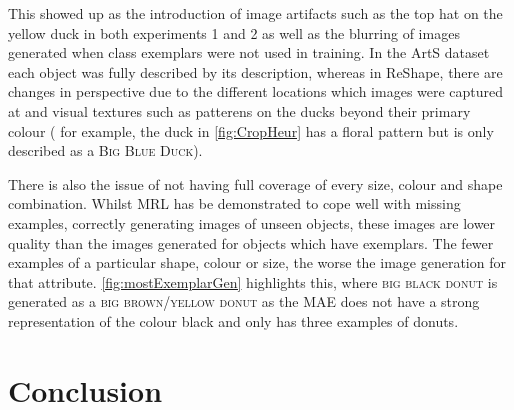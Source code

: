 This showed up as the introduction of image artifacts such as the top hat on the yellow duck in both experiments 1 and 2 as well as the blurring of images generated when class exemplars were not used in training. In the ArtS dataset each object was fully described by its description, whereas in ReShape, there are changes in perspective due to the different locations which images were captured at and visual textures such as patterens on the ducks beyond their primary colour ( for example, the duck in \autoref{fig:CropHeur} has a floral pattern but is only described as a \textsc{Big Blue Duck}).

There is also the issue of not having full coverage of every size, colour and shape combination. Whilst MRL has be demonstrated to cope well with missing examples, correctly generating images of unseen objects, these images are lower quality than the images generated for objects which have exemplars. The fewer examples of a particular shape, colour or size, the worse the image generation for that attribute. \autoref{fig:mostExemplarGen} highlights this, where \textsc{big black donut} is generated as a \textsc{big brown/yellow donut} as the MAE does not have a strong representation of the colour black and only has three examples of donuts.



\section{Conclusion}
\theendnotes